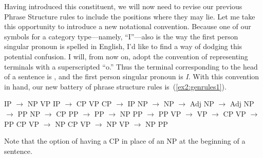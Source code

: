 Having introduced this constituent, we will now need to revise our previous Phrase Structure rules to include the positions where they may lie. Let me take this opportunity to introduce a new notational convention. Because one of our symbols for a category type---namely, ``I''---also is the way the first person singular pronoun is spelled in English, I'd like to find a way of dodging this potential confusion. I will, from now on, adopt the convention of representing terminals with a superscripted ``o.'' Thus the terminal corresponding to the head of a sentence is , and the first person singular pronoun is \emph{I}. With this convention in hand, our new battery of phrase structure rules is~(\ref{ex2:genrules1}).
\begin{exe}
	\ex \label{ex2:genrules1} 
	\begin{xlist}
	\ex IP $\rightarrow$ NP  VP
	\ex IP $\rightarrow$ CP  VP
	\ex CP $\rightarrow$  IP
		\ex NP $\rightarrow$ 
		\ex NP $\rightarrow$ Adj  
		\ex NP $\rightarrow$  Adj  
		\ex NP $\rightarrow$  PP
		\ex NP $\rightarrow$  CP
		\ex PP $\rightarrow$ 
	\ex PP $\rightarrow$  NP
	\ex PP $\rightarrow$  PP
	\ex VP $\rightarrow$  
	\ex VP $\rightarrow$  CP
	\ex VP $\rightarrow$  PP CP
	\ex VP $\rightarrow$  NP CP
	\ex VP $\rightarrow$  NP
	\ex VP $\rightarrow$  NP PP
	\end{xlist}
\end{exe}
Note that the option of having a CP in place of an NP at the beginning of a sentence.

